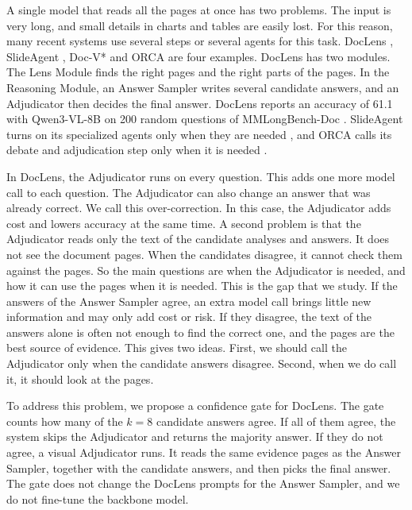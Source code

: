 A single model that reads all the pages at once has two problems. The input is very long, and small details in charts and tables are easily lost. For this reason, many recent systems use several steps or several agents for this task. DocLens \cite{zhu2025doclens}, SlideAgent \cite{slideagent}, Doc-V* \cite{docvstar} and ORCA \cite{orca} are four examples. DocLens has two modules. The Lens Module finds the right pages and the right parts of the pages. In the Reasoning Module, an Answer Sampler writes several candidate answers, and an Adjudicator then decides the final answer. DocLens reports an accuracy of 61.1 with Qwen3-VL-8B on 200 random questions of MMLongBench-Doc \cite{zhu2025doclens}. SlideAgent turns on its specialized agents only when they are needed \cite{slideagent}, and ORCA calls its debate and adjudication step only when it is needed \cite{orca}. %

In DocLens, the Adjudicator runs on every question. This adds one more model call to each question. The Adjudicator can also change an answer that was already correct. We call this over-correction. In this case, the Adjudicator adds cost and lowers accuracy at the same time. A second problem is that the Adjudicator reads only the text of the candidate analyses and answers. It does not see the document pages. When the candidates disagree, it cannot check them against the pages. So the main questions are when the Adjudicator is needed, and how it can use the pages when it is needed. This is the gap that we study. If the answers of the Answer Sampler agree, an extra model call brings little new information and may only add cost or risk. If they disagree, the text of the answers alone is often not enough to find the correct one, and the pages are the best source of evidence. This gives two ideas. First, we should call the Adjudicator only when the candidate answers disagree. Second, when we do call it, it should look at the pages.

To address this problem, we propose a confidence gate for DocLens. The gate counts how many of the $k=8$ candidate answers agree. If all of them agree, the system skips the Adjudicator and returns the majority answer. If they do not agree, a visual Adjudicator runs. It reads the same evidence pages as the Answer Sampler, together with the candidate answers, and then picks the final answer. The gate does not change the DocLens prompts for the Answer Sampler, and we do not fine-tune the backbone model.


